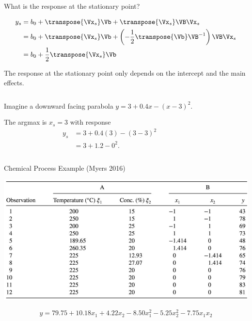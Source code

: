 \documentclass[10pt]{beamer}
\begin{document}
\begin{frame}{What is the response at the stationary point?}

\begin{align*}
	y_s &= b_0 + \transpose{\Vx_s}\Vb + \transpose{\Vx_s}\VB\Vx_s \\
		&= b_0 + \transpose{\Vx_s}\Vb + \left(-\frac{1}{2}\transpose{\Vb}\VB^{-1}\right)\VB\Vx_s \\
		&= b_0 + \frac{1}{2}\transpose{\Vx_s}\Vb
\end{align*}

\pause
The response at the stationary point only depends on the intercept and the main effects.

\pause
\bigskip
\begin{columns}
\begin{column}{0.5\textwidth}
	Imagine a downward facing parabola $y = 3 + 0.4x - (x-3)^2$.
	
	\bigskip
	The argmax is $x_s=3$ with response 
	\begin{align*} 
		y_s &= 3 + 0.4(3) - (3-3)^2 \\
		 &= 3 + 1.2 - 0^2.
	\end{align*}
\end{column}	

\begin{column}{0.5\textwidth}
\end{column}	
\end{columns}	
\end{frame}

\begin{frame}{Chemical Process Example (Myers 2016)}

\includegraphics[width=\textwidth]{figures/rsm_chemical.png}
	
\pause
\[ y = 79.75 + 10.18x_1 + 4.22x_2 - 8.50x_1^2 - 5.25x_2^2 - 7.75x_1x_2 \]
\end{frame}
\end{document}
